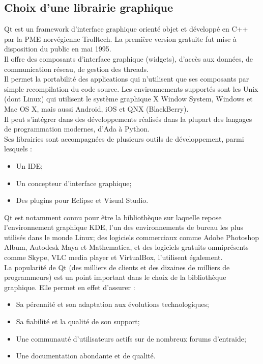 \documentclass[a4paper,titlepage]{scrreprt}
\begin{document}
  \subsection{Choix d'une librairie graphique}
  Qt est un framework d'interface graphique orienté objet et développé en C++ par la PME norvégienne Trolltech.
La première version gratuite fut mise à disposition du public en mai 1995\cite{Blanchette2006}. \\
Il offre des composants d'interface graphique (widgets), d'accès aux données, de communication réseau, de gestion des threads. \\
Il permet la portabilité des applications qui n'utilisent que ses composants par simple recompilation du code source.
Les environnements supportés sont les Unix (dont Linux) qui utilisent le système graphique X Window System, Windows et Mac OS X,
mais aussi Android, iOS et QNX (BlackBerry). \\
Il peut s'intégrer dans des développements réalisés dans la plupart des langages de programmation modernes, d'Ada à Python. \\
Ses librairies sont accompagnées de plusieurs outils de développement, parmi lesquels :
\begin{itemize}
\item Un IDE;
\item Un concepteur d'interface graphique;
\item Des plugins pour Eclipse et Visual Studio.
\end{itemize}

Qt est notamment connu pour être la bibliothèque sur laquelle repose l'environnement graphique KDE, l'un des environnements de bureau les plus utilisés dans le monde Linux;
des logiciels commerciaux comme Adobe Photoshop Album, Autodesk Maya et Mathematica, et
des logiciels gratuits omniprésents comme Skype, VLC media player et VirtualBox, l'utilisent également. \\
La popularité de Qt (des milliers de clients et des dizaines de milliers de programmeurs) est un point important dans le choix de la bibliothèque graphique.
Elle permet en effet d'assurer :
\begin{itemize}
\item Sa pérennité et son adaptation aux évolutions technologiques;
\item Sa fiabilité et la qualité de son support;
\item Une communauté d'utilisateurs actifs sur de nombreux forums d'entraide;
\item Une documentation abondante et de qualité.
\end{itemize}
\end{document}

